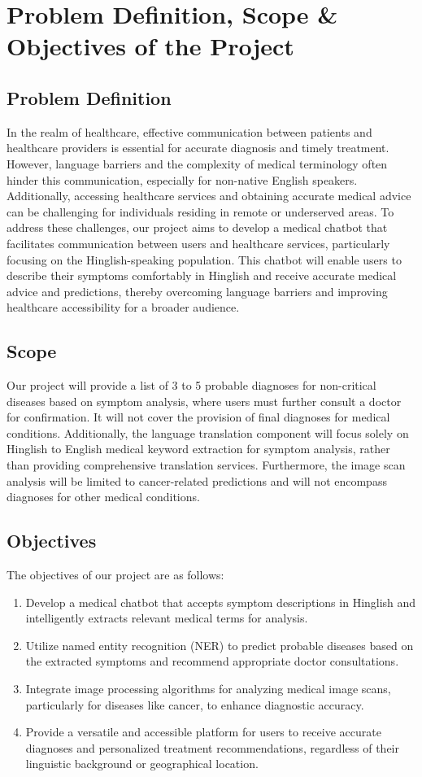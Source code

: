 \documentclass[onecolumn]{article}
\begin{document}
\section{Problem Definition, Scope \& Objectives of the Project}
\subsection{Problem Definition}
In the realm of healthcare, effective communication between patients and healthcare providers is essential for accurate diagnosis and timely treatment. However, language barriers and the complexity of medical terminology often hinder this communication, especially for non-native English speakers. Additionally, accessing healthcare services and obtaining accurate medical advice can be challenging for individuals residing in remote or underserved areas. To address these challenges, our project aims to develop a medical chatbot that facilitates communication between users and healthcare services, particularly focusing on the Hinglish-speaking population. This chatbot will enable users to describe their symptoms comfortably in Hinglish and receive accurate medical advice and predictions, thereby overcoming language barriers and improving healthcare accessibility for a broader audience.

\subsection{Scope}
Our project will provide a list of 3 to 5 probable diagnoses for non-critical diseases based on symptom analysis, where users must further consult a doctor for confirmation. It will not cover the provision of final diagnoses for medical conditions. Additionally, the language translation component will focus solely on Hinglish to English medical keyword extraction for symptom analysis, rather than providing comprehensive translation services. Furthermore, the image scan analysis will be limited to cancer-related predictions and will not encompass diagnoses for other medical conditions.

\subsection{Objectives}
The objectives of our project are as follows:
\begin{enumerate}
\item Develop a medical chatbot that accepts symptom descriptions in Hinglish and intelligently extracts relevant medical terms for analysis.
\item Utilize named entity recognition (NER) to predict probable diseases based on the extracted symptoms and recommend appropriate doctor consultations.
\item Integrate image processing algorithms for analyzing medical image scans, particularly for diseases like cancer, to enhance diagnostic accuracy.
\item Provide a versatile and accessible platform for users to receive accurate diagnoses and personalized treatment recommendations, regardless of their linguistic background or geographical location.
\end{enumerate}
\end{document}

